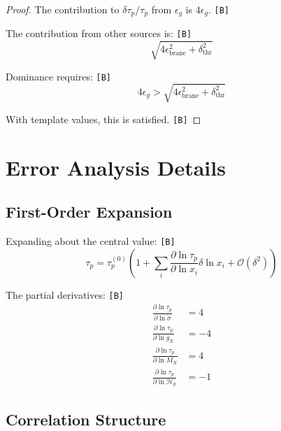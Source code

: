 \documentclass[11pt,a4paper]{article}
\newcommand{\tagB}{\textcolor{purple!70!black}{\texttt{[B]}}}
\theoremstyle{definition}
\begin{document}
\begin{proof}
The contribution to $\delta\tau_p/\tau_p$ from $\epsilon_g$ is $4\epsilon_g$. \tagB{}

The contribution from other sources is: \tagB{}
\begin{equation}
\label{eq:prop-other}
\sqrt{4\epsilon_{\text{brane}}^2 + \delta_{\text{thr}}^2}
\end{equation}

Dominance requires: \tagB{}
\begin{equation}
\label{eq:prop-dom}
4\epsilon_g > \sqrt{4\epsilon_{\text{brane}}^2 + \delta_{\text{thr}}^2}
\end{equation}

With template values, this is satisfied. \tagB{}
\end{proof}

\section{Error Analysis Details}
\label{sec:error-detail}

\subsection{First-Order Expansion}
\label{subsec:first-order}

Expanding about the central value: \tagB{}
\begin{equation}
\label{eq:expand-1}
\tau_p = \tau_p^{(0)} \left(1 + \sum_i \frac{\partial\ln\tau_p}{\partial\ln x_i} \delta\ln x_i + \mathcal{O}(\delta^2)\right)
\end{equation}

The partial derivatives: \tagB{}
\begin{align}
\label{eq:expand-d-sigma}
\frac{\partial\ln\tau_p}{\partial\ln\tilde{\sigma}} &= 4 \\
\label{eq:expand-d-gx}
\frac{\partial\ln\tau_p}{\partial\ln g_X} &= -4 \\
\label{eq:expand-d-mx}
\frac{\partial\ln\tau_p}{\partial\ln M_X} &= 4 \\
\label{eq:expand-d-hp}
\frac{\partial\ln\tau_p}{\partial\ln\mathcal{H}_p} &= -1
\end{align}

\subsection{Correlation Structure}
\label{subsec:correlation}
\end{document}

